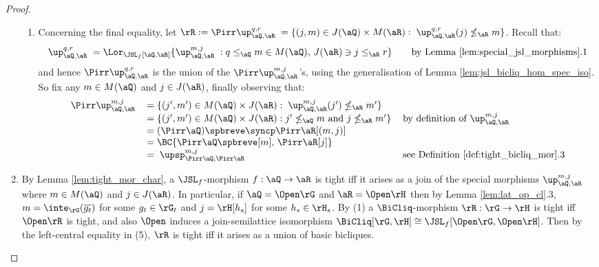 \documentclass{article}
\begin{document}
\begin{proof}
\begin{enumerate}
\begin{enumerate}
\item
Concerning the final equality, let $\rR := \Pirr \up_{\aQ,\aR}^{q,r} \; = \{ (j,m) \in J(\aQ) \times M(\aR) : \; \up_{\aQ,\aR}^{q,r}(j) \nleq_\aR m \}$. Recall that:
\[
\up_{\aQ,\aR}^{q,r}
\; = \Lor_{\JSL_f[\aQ,\aR]} \{ \up_{\aQ,\aR}^{m,j} \; : q \leq_\aQ m \in M(\aQ), \, J(\aR) \ni j \leq_\aR r \}
\qquad
\text{by Lemma \ref{lem:special_jsl_morphisms}.1}
\]
and hence $\Pirr \up_{\aQ,\aR}^{q,r}$ is the union of the $\Pirr \up_{\aQ,\aR}^{m,j}$'s, using the generalisation of Lemma \ref{lem:jsl_bicliq_hom_spec_iso}. So fix any $m \in M(\aQ)$ and $j \in J(\aR)$, finally observing that:
\[
\begin{tabular}{lll}
$\Pirr \up_{\aQ,\aR}^{m,j}$
&
$= \{ (j',m') \in M(\aQ) \times J(\aR) : \; \up_{\aQ,\aR}^{m,j}(j') \nleq_\aR m' \}$
\\&
$= \{ (j',m') \in M(\aQ) \times J(\aR) : j' \nleq_\aQ m \text{ and } j \nleq_\aR m'  \}$
& by definition of $\up_{\aQ,\aR}^{m,j}$
\\&
$= (\Pirr \aQ)\spbreve \syncp \Pirr\aR [(m,j)]$
\\&
$= \BC{\Pirr\aQ\spbreve[m],\,\Pirr\aR[j]}$
\\&
$= \; \upsp_{\Pirr\aQ,\Pirr\aR}^{m,j}$
& see Definition \ref{def:tight_bicliq_mor}.3
\end{tabular}
\] 
\end{enumerate}


\item
By Lemma \ref{lem:tight_mor_char}, a $\JSL_f$-morphism $f : \aQ \to \aR$ is tight iff it arises as a join of the special morphisms $\up_{\aQ,\aR}^{m,j}$ where $m \in M(\aQ)$ and $j \in J(\aR)$. In particular, if $\aQ = \Open\rG$ and $\aR = \Open\rH$ then by Lemma \ref{lem:lat_op_cl}.3, $m = \inte_\rG(\overline{g_t})$ for some $g_t \in \rG_t$ and $j = \rH[h_s]$ for some $h_s \in \rH_s$. By (1) a $\BiCliq$-morphism $\rR : \rG \to \rH$ is tight iff $\Open\rR$ is tight, and also $\Open$ induces a join-semilattice isomorphism $\BiCliq[\rG,\rH] \cong \JSL_f[\Open\rG,\Open\rH]$. Then by the left-central equality in (5), $\rR$ is tight iff it arises as a union of basic bicliques.


\end{enumerate}
\end{proof}
\end{document}
